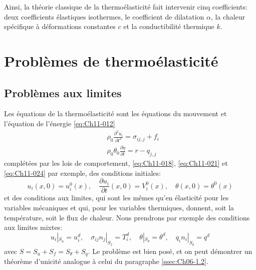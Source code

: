 Ainsi, la théorie classique de la thermoélasticité fait intervenir cinq coefficients: deux coefficients élastiques isothermes, le coefficient de dilatation $\alpha$, la chaleur spécifique à déformations constantes $c$ et la conductibilité thermique $k$.
\section{Problèmes de thermoélasticité}\label{sec:Ch11-2}
\subsection{Problèmes aux limites}\label{ssec:Ch11-2.1}
Les équations de la thermoélasticité sont les équations du mouvement et l'équation de l'énergie \eqref{eq:Ch11-012}
\begin{subequations}
\begin{align}
    &\rho_0 \frac{\partial^2 u_i}{\partial t^2} = \sigma_{ij,j}+f_i
    \label{eq:Ch11-026}\\
    &\rho_0 \theta_0 \frac{\partial \eta}{\partial t} = r - q_{j,j}
    \label{eq:Ch11-027}
\end{align}
\end{subequations}
complétées par les lois de comportement, \eqref{eq:Ch11-018}, \eqref{eq:Ch11-021} et \eqref{eq:Ch11-024} par exemple, des conditions initiales: 
\begin{equation}
    u_i(x,0) = u_i^0(x), \quad \frac{\partial u_i}{\partial t}(x,0) = V_i^0(x),\quad
    \theta(x,0) = \theta^0(x)
    \label{eq:Ch11-028}
\end{equation}
et des conditions aux limites, qui sont les mêmes qu'en élasticité pour les variables mécaniques et qui, pour les variables thermiques, donnent, soit la température, soit le flux de chaleur.
Nous prendrons par exemple des conditions aux limites mixtes: 
\begin{equation}
    u_i|_{S_u} = u_i^d,\quad  \sigma_{ij}n_j|_{S_f} = T_i^d,\quad\theta|_{S_\theta} = \theta^d,\quad  q_in_i|_{S_q} = q^d
    \label{eq:Ch11-029}
\end{equation}
avec $S =S_u+S_f=S_{\theta}+S_q$.
Le problème est bien posé, et on peut démontrer un théorème d'unicité analogue à celui du paragraphe \ref{ssec:Ch06-1.2}.
 
